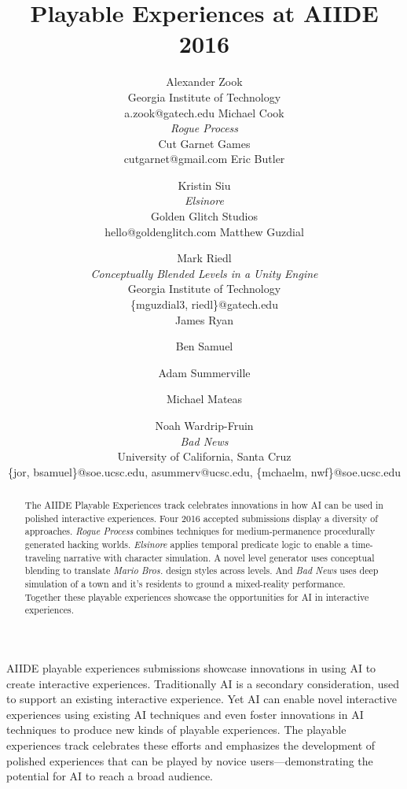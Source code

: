 \documentclass[letterpaper]{article}
\begin{document}
\title{Playable Experiences at AIIDE 2016}
\author{
Alexander Zook \\ Georgia Institute of Technology \\ a.zook@gatech.edu
\And Michael Cook \\ \textit{Rogue Process} \\ Cut Garnet Games \\ cutgarnet@gmail.com
\AND Eric Butler \and Kristin Siu \\ \textit{Elsinore} \\ Golden Glitch Studios \\ hello@goldenglitch.com
\And Matthew Guzdial \and Mark Riedl \\ \textit{Conceptually Blended Levels in a Unity Engine} \\ Georgia Institute of Technology \\ \{mguzdial3, riedl\}@gatech.edu \\
\AND James Ryan \and Ben Samuel \and Adam Summerville \and Michael Mateas \and Noah Wardrip-Fruin \\ \textit{Bad News} \\ University of California, Santa Cruz \\ \{jor, bsamuel\}@soe.ucsc.edu, asummerv@ucsc.edu, \{mchaelm, nwf\}@soe.ucsc.edu  \\
}


\maketitle
\begin{abstract}
The AIIDE Playable Experiences track celebrates innovations in how AI can be used in polished interactive experiences.
Four 2016 accepted submissions display a diversity of approaches. 
\textit{Rogue Process} combines techniques for medium-permanence procedurally generated hacking worlds.
\textit{Elsinore} applies temporal predicate logic to enable a time-traveling narrative with character simulation.
A novel level generator uses conceptual blending to translate \textit{Mario Bros.} design styles across levels.
And \textit{Bad News} uses deep simulation of a town and it's residents to ground a mixed-reality performance.
Together these playable experiences showcase the opportunities for AI in interactive experiences.
\end{abstract}

\noindent AIIDE playable experiences submissions showcase innovations in using AI to create interactive experiences.
Traditionally AI is a secondary consideration, used to support an existing interactive experience.
Yet AI can enable novel interactive experiences using existing AI techniques and even foster innovations in AI techniques to produce new kinds of playable experiences.
The playable experiences track celebrates these efforts and emphasizes the development of polished experiences that can be played by novice users---demonstrating the potential for AI to reach a broad audience.
\end{document}
